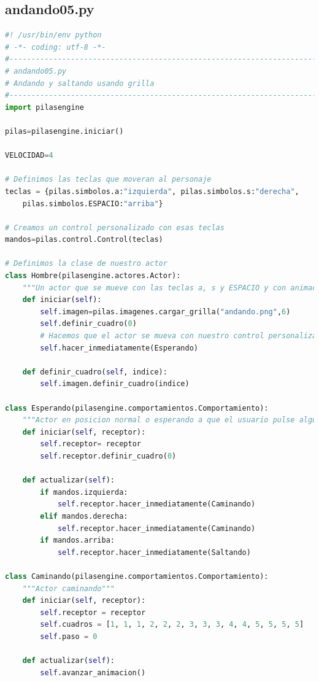 \documentclass{article}
\begin{document}
\clearpage
\subsection{andando05.py}

\begin{lstlisting}[language=Python]
#! /usr/bin/env python
# -*- coding: utf-8 -*-
#-----------------------------------------------------------------------
# andando05.py
# Andando y saltando usando grilla
#-----------------------------------------------------------------------
import pilasengine

pilas=pilasengine.iniciar()

VELOCIDAD=4

# Definimos las teclas que moveran al personaje
teclas = {pilas.simbolos.a:"izquierda", pilas.simbolos.s:"derecha", 
    pilas.simbolos.ESPACIO:"arriba"}

# Creamos un control personalizado con esas teclas
mandos=pilas.control.Control(teclas)

# Definimos la clase de nuestro actor
class Hombre(pilasengine.actores.Actor):
    """Un actor que se mueve con las teclas a, s y ESPACIO y con animación"""
    def iniciar(self):
        self.imagen=pilas.imagenes.cargar_grilla("andando.png",6)
        self.definir_cuadro(0)
        # Hacemos que el actor se mueva con nuestro control personalizado
        self.hacer_inmediatamente(Esperando)
    
    def definir_cuadro(self, indice):
        self.imagen.definir_cuadro(indice)
    
class Esperando(pilasengine.comportamientos.Comportamiento):
    """Actor en posicion normal o esperando a que el usuario pulse alguna tecla"""
    def iniciar(self, receptor):
        self.receptor= receptor
        self.receptor.definir_cuadro(0)

    def actualizar(self):
        if mandos.izquierda:
            self.receptor.hacer_inmediatamente(Caminando)
        elif mandos.derecha:
            self.receptor.hacer_inmediatamente(Caminando)
        if mandos.arriba:
            self.receptor.hacer_inmediatamente(Saltando)
        
class Caminando(pilasengine.comportamientos.Comportamiento):
    """Actor caminando"""
    def iniciar(self, receptor):
        self.receptor = receptor
        self.cuadros = [1, 1, 1, 2, 2, 2, 3, 3, 3, 4, 4, 5, 5, 5, 5]
        self.paso = 0

    def actualizar(self):
        self.avanzar_animacion()
        

\end{lstlisting}
\end{document}
